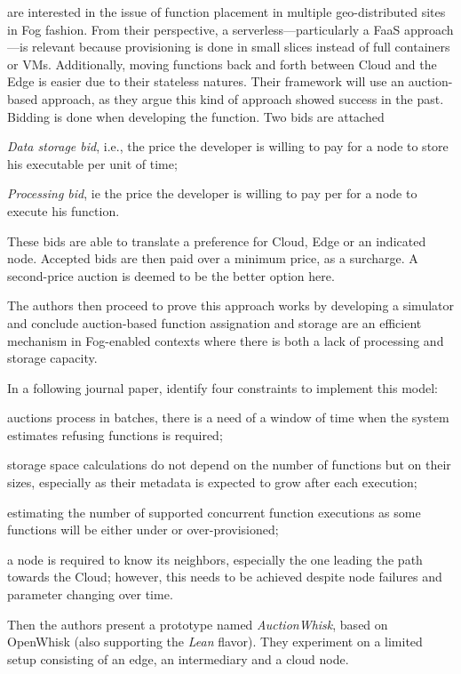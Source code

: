 \begin{description}[leftmargin=10pt]
	\item[\citet{bermbach_towards_2021}] are interested in the issue of function placement in multiple geo-distributed sites in Fog fashion. From their perspective, a serverless—particularly a \gls{FaaS} approach—is relevant because provisioning is done in small slices instead of full containers or \glspl{VM}. Additionally, moving functions back and forth between Cloud and the Edge is easier due to their stateless natures. Their framework will use an auction-based approach, as they argue this kind of approach showed success in the past.
		Bidding is done when developing the function. Two bids are attached
		\begin{enumerate*}[(a)]
			\item \emph{Data storage bid}, i.e., the price the developer is willing to pay for a node to store his executable per unit of time;
			\item \emph{Processing bid}, ie the price the developer is willing to pay per for a node to execute his function.
		\end{enumerate*}
		These bids are able to translate a preference for Cloud, Edge or an indicated node. Accepted bids are then paid over a minimum price, as a surcharge. A second-price auction is deemed to be the better option here.

		The authors then proceed to prove this approach works by developing a simulator and conclude auction-based function assignation and storage are an efficient mechanism in Fog-enabled contexts where there is both a lack of processing and storage capacity.

		In a following journal paper, \citet{bermbach_auctionwhisk_2021} identify four constraints to implement this model:
		\begin{enumerate*}[(i)]
			\item auctions process in batches, there is a need of a window of time when the system estimates refusing functions is required;
			\item storage space calculations do not depend on the number of functions but on their sizes, especially as their metadata is expected to grow after each execution;
			\item estimating the number of supported concurrent function executions as some functions will be either under or over-provisioned;
			\item a node is required to know its neighbors, especially the one leading the path towards the Cloud; however, this needs to be achieved despite node failures and parameter changing over time.
		\end{enumerate*}

		Then the authors present a prototype named \emph{AuctionWhisk}, based on OpenWhisk (also supporting the \emph{Lean} flavor). They experiment on a limited setup consisting of an edge, an intermediary and a cloud node.

\end{description}

